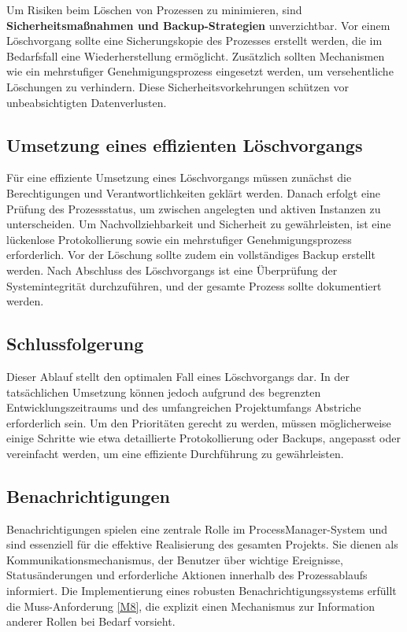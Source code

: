 Um Risiken beim Löschen von Prozessen zu minimieren, sind \textbf{Sicherheitsmaßnahmen und Backup-Strategien} unverzichtbar. Vor einem Löschvorgang sollte eine Sicherungskopie des Prozesses erstellt werden, die im Bedarfsfall eine Wiederherstellung ermöglicht. Zusätzlich sollten Mechanismen wie ein mehrstufiger Genehmigungsprozess eingesetzt werden, um versehentliche Löschungen zu verhindern. Diese Sicherheitsvorkehrungen schützen vor unbeabsichtigten Datenverlusten.

\subsection*{Umsetzung eines effizienten Löschvorgangs}
Für eine effiziente Umsetzung eines Löschvorgangs müssen zunächst die Berechtigungen und Verantwortlichkeiten geklärt werden. Danach erfolgt eine Prüfung des Prozessstatus, um zwischen angelegten und aktiven Instanzen zu unterscheiden. Um Nachvollziehbarkeit und Sicherheit zu gewährleisten, ist eine lückenlose Protokollierung sowie ein mehrstufiger Genehmigungsprozess erforderlich. Vor der Löschung sollte zudem ein vollständiges Backup erstellt werden. Nach Abschluss des Löschvorgangs ist eine Überprüfung der Systemintegrität durchzuführen, und der gesamte Prozess sollte dokumentiert werden.

\subsection*{Schlussfolgerung}
Dieser Ablauf stellt den optimalen Fall eines Löschvorgangs dar. In der tatsächlichen Umsetzung können jedoch aufgrund des begrenzten Entwicklungszeitraums und des umfangreichen Projektumfangs Abstriche erforderlich sein. Um den Prioritäten gerecht zu werden, müssen möglicherweise einige Schritte wie etwa detaillierte Protokollierung oder Backups, angepasst oder vereinfacht werden, um eine effiziente Durchführung zu gewährleisten.

\subsection{Benachrichtigungen} \label{Benachrichtigungen}
Benachrichtigungen spielen eine zentrale Rolle im ProcessManager-System und sind essenziell für die effektive Realisierung des gesamten Projekts. Sie dienen als Kommunikationsmechanismus, der Benutzer über wichtige Ereignisse, Statusänderungen und erforderliche Aktionen innerhalb des Prozessablaufs informiert. Die Implementierung eines robusten Benachrichtigungssystems erfüllt die Muss-Anforderung \ref{M8}, die explizit einen Mechanismus zur Information anderer Rollen bei Bedarf vorsieht.

